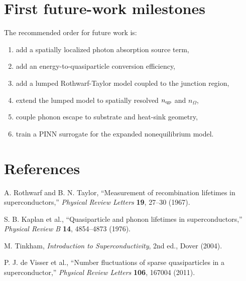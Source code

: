 \documentclass[11pt]{article}
\begin{document}
\section{First future-work milestones}
The recommended order for future work is:
\begin{enumerate}[leftmargin=1.6em]
    \item add a spatially localized photon absorption source term,
    \item add an energy-to-quasiparticle conversion efficiency,
    \item add a lumped Rothwarf-Taylor model coupled to the junction region,
    \item extend the lumped model to spatially resolved $n_{\mathrm{qp}}$ and $n_\Omega$,
    \item couple phonon escape to substrate and heat-sink geometry,
    \item train a PINN surrogate for the expanded nonequilibrium model.
\end{enumerate}

\section{References}
\begin{enumerate}[label={[\arabic*]}]
\item A. Rothwarf and B. N. Taylor, ``Measurement of recombination lifetimes in superconductors,'' \emph{Physical Review Letters} \textbf{19}, 27--30 (1967).
\item S. B. Kaplan et al., ``Quasiparticle and phonon lifetimes in superconductors,'' \emph{Physical Review B} \textbf{14}, 4854--4873 (1976).
\item M. Tinkham, \emph{Introduction to Superconductivity}, 2nd ed., Dover (2004).
\item P. J. de Visser et al., ``Number fluctuations of sparse quasiparticles in a superconductor,'' \emph{Physical Review Letters} \textbf{106}, 167004 (2011).
\end{enumerate}
\end{document}
